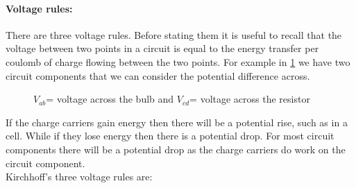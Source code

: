\documentclass[a4paper,12pt]{book}
\begin{document}
\paragraph{Voltage rules:} There are three voltage rules. Before stating them it is useful to recall that the voltage between two points in a circuit is equal to the energy transfer per coulomb of charge flowing between the two points.  For example in \cref{fig: voltage rule 0} we have two circuit components that we can consider the potential difference across. 

\begin{figure}[ht]
    \centering
    \caption{$V_{ab}$= voltage across the bulb and $V_{cd}$= voltage across the resistor}
    \label{fig: voltage rule 0}
\end{figure}

If the charge carriers gain energy then there will be a potential rise, such as in a cell. While if they lose energy then there is a potential drop. For most circuit components there will be a potential drop as the charge carriers do work on the circuit component.\\

Kirchhoff's three voltage rules are:
\end{document}
